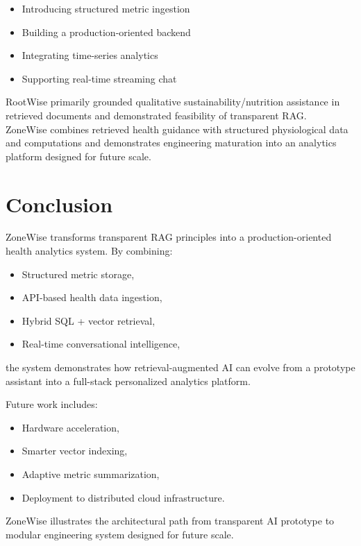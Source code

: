 \documentclass[11pt,twocolumn]{article}
\begin{document}
\begin{itemize}
    \item Introducing structured metric ingestion
    \item Building a production-oriented backend
    \item Integrating time-series analytics
    \item Supporting real-time streaming chat
\end{itemize}

RootWise primarily grounded qualitative sustainability/nutrition assistance in retrieved documents and demonstrated feasibility of transparent RAG.\\
ZoneWise combines retrieved health guidance with structured physiological data and computations and demonstrates engineering maturation into an analytics platform designed for future scale.


\section{Conclusion}

ZoneWise transforms transparent RAG principles into a production-oriented health analytics system. By combining:

\begin{itemize}
    \item Structured metric storage,
    \item API-based health data ingestion,
    \item Hybrid SQL + vector retrieval,
    \item Real-time conversational intelligence,
\end{itemize}

the system demonstrates how retrieval-augmented AI can evolve from a prototype assistant into a full-stack personalized analytics platform.

Future work includes:

\begin{itemize}
    \item Hardware acceleration,
    \item Smarter vector indexing,
    \item Adaptive metric summarization,
    \item Deployment to distributed cloud infrastructure.
\end{itemize}

ZoneWise illustrates the architectural path from transparent AI prototype to modular engineering system designed for future scale.
\end{document}
